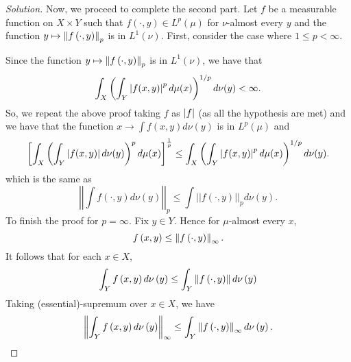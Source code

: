 \begin{proof}[Solution]
Now, we proceed to complete the second part. Let $f$ be a measurable function on $X \times Y$ such that $f\left( \cdot, y \right) \in L^{p} \left( \mu \right)$ for $\nu$-almost every $y$ and the function $y \mapsto \left\lVert f\left( \cdot , y \right) \right\rVert_{p}$ is in $L^{1} \left( \nu \right)$. First, consider the case where $1\le p < \infty$.

Since the function $y \mapsto \left\lVert f\left( \cdot , y \right) \right\rVert_{p}$ is in $L^{1} \left( \nu \right)$, we have that
\begin{equation*}
\int_{X} \left( \int_{Y} \left\lvert f(x,y) \right\rvert^{p} d\mu (x) \right)^{1/p} d\nu (y) < \infty.
\end{equation*}
So, we repeat the above proof taking $f$ as $\left\lvert f \right\rvert$ (as all the hypothesis are met) and we have that the function $x \to \int f(x,y) d\nu(y)$ is in $L^p(\mu)$ and
\begin{equation*}
\left[\int_X \left(\int_Y \left\lvert f(x,y) \right\rvert d\nu(y) \right)^pd\mu(x)\right]^\frac{1}{p} \le \int_{X} \left( \int_{Y} \left\lvert f(x,y) \right\rvert^{p} d\mu (x) \right)^{1/p} d\nu (y).
\end{equation*}
which is the same as
$$\left|\left|\int f(\cdot, y)d\nu(y)\right|\right|_p \le \int||f(\cdot, y)||_pd\nu(y).$$ 
To finish the proof for $p=\infty$. Fix $y\in Y$. Hence for $\mu$-almost every $x$,
\begin{equation*}
f\left( x,y \right) \le \left\lVert f\left( \cdot, y \right) \right\rVert_{\infty}.
\end{equation*}
It follows that for each $x \in X$,
\begin{equation*}
\int_{Y} f\left( x,y \right) d\nu \left( y \right) \le \int_{Y} \left\lVert f\left( \cdot, y \right) \right\rVert d\nu \left( y \right)
\end{equation*}
Taking (essential)-supremum over $x\in X$, we have
\begin{equation*}
\left\lVert \int_{Y} f\left( x,y \right) d\nu \left( y \right) \right\rVert_{\infty} \le \int_{Y} \left\lVert f\left( \cdot, y \right) \right\rVert_{\infty} d\nu \left( y \right).
\end{equation*}
\end{proof}
